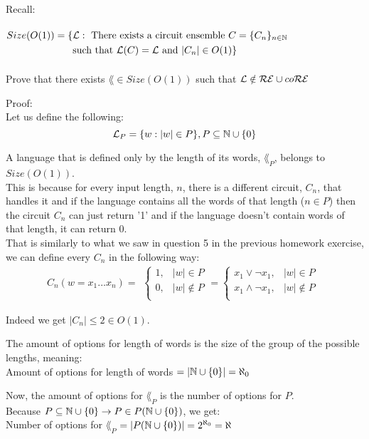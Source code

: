 Recall: \\ \\
$
    \begin{aligned}
        Size(O(1)) = \{ & \mathcal{L} : \text{ There exists a circuit ensemble } C=\{C_n\}_{n \in \mathbb{N}} \\
                        & \text{such that } \mathcal{L}(C)=\mathcal{L} \text{ and } |C_n|\in O(1)\}
    \end{aligned}
$ \\ \\

Prove that there exists $\lang \in Size(O(1))$ such that $\mathcal{L} \notin \mathcal{R}\mathcal{E} \cup co\mathcal{R}\mathcal{E}$

Proof: \\
Let us define the following:
\[
    \mathcal{L}_P = \{w : |w| \in P\}, P \subseteq \mathbb{N} \cup \{0\}
\]

A language that is defined only by the length of its words, $\lang_P$, belongs to $Size(O(1))$. \\
This is because for every input length, $n$, there is a different circuit, $C_n$, that handles it and if the
language contains all the words of that length ($n \in P$) then the circuit $C_n$ can just return '1'
and if the language doesn't contain words of that length, it can return 0. \\
That is similarly to what we saw in question 5 in the previous homework exercise,
we can define every $C_n$ in the following way:
\[
    C_n(w=x_1...x_n) =
    \begin{aligned}
        \begin{cases}
            1 , & |w| \in P    \\
            0 , & |w| \notin P \\
        \end{cases}
        =
        \begin{cases}
            x_1 \vee \neg x_1 ,   & |w| \in P    \\
            x_1 \wedge \neg x_1 , & |w| \notin P \\
        \end{cases}
    \end{aligned}
\]

Indeed we get $|C_n| \leq 2 \in O(1)$.

The amount of options for length of words is the size of the group of the possible lengths, meaning: \\
Amount of options for length of words $=|\mathbb{N} \cup \{0\}| = \aleph_0$

Now, the amount of options for  $\lang_P$ is the number of options for $P$. \\
Because $P \subseteq \mathbb{N} \cup \{0\} \rightarrow P \in P(\mathbb{N} \cup \{0\})$, we get: \\
Number of options for $\lang_P$ $=|P(\mathbb{N} \cup \{0\})| = 2^{\aleph_0} = \aleph$

